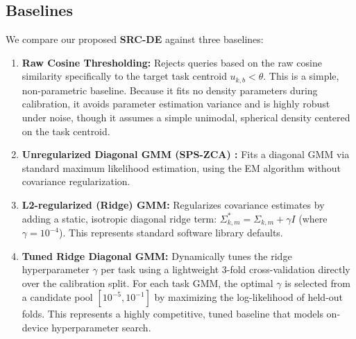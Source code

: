 \subsection{Baselines}
We compare our proposed {\bf SRC-DE} against three baselines:
\begin{enumerate}
    \item {\bf Raw Cosine Thresholding:} Rejects queries based on the raw cosine similarity specifically to the target task centroid $u_{k, b} < \theta$. This is a simple, non-parametric baseline. Because it fits no density parameters during calibration, it avoids parameter estimation variance and is highly robust under noise, though it assumes a simple unimodal, spherical density centered on the task centroid.
    \item {\bf Unregularized Diagonal GMM (SPS-ZCA) \cite{pfsr2025}:} Fits a diagonal GMM via standard maximum likelihood estimation, using the EM algorithm without covariance regularization.
    \item {\bf L2-regularized (Ridge) GMM:} Regularizes covariance estimates by adding a static, isotropic diagonal ridge term: $\Sigma^{*}_{k, m} = \Sigma_{k, m} + \gamma I$ (where $\gamma = 10^{-4}$). This represents standard software library defaults.
    \item {\bf Tuned Ridge Diagonal GMM:} Dynamically tunes the ridge hyperparameter $\gamma$ per task using a lightweight 3-fold cross-validation directly over the calibration split. For each task GMM, the optimal $\gamma$ is selected from a candidate pool $[10^{-5}, 10^{-1}]$ by maximizing the log-likelihood of held-out folds. This represents a highly competitive, tuned baseline that models on-device hyperparameter search.
\end{enumerate}

